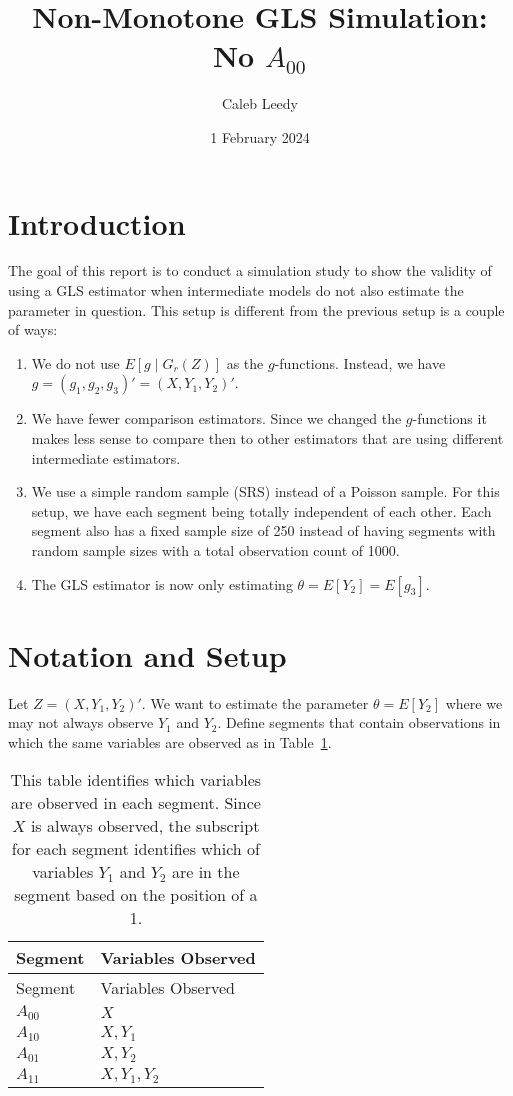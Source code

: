 \documentclass[
  letterpaper,
  DIV=11,
  numbers=noendperiod]{scrartcl}
\title{Non-Monotone GLS Simulation: No \(A_{00}\)}
\author{Caleb Leedy}
\date{1 February 2024}
\providecommand{\tightlist}{%
  \setlength{\itemsep}{0pt}\setlength{\parskip}{0pt}}\usepackage{longtable,booktabs,array}
\begin{document}
\maketitle

\section{Introduction}\label{introduction}

The goal of this report is to conduct a simulation study to show the
validity of using a GLS estimator when intermediate models do not also
estimate the parameter in question. This setup is different from the
previous setup is a couple of ways:

\begin{enumerate}
\def\labelenumi{\arabic{enumi}.}
\tightlist
\item
  We do not use \(E[g \mid G_r(Z)]\) as the \(g\)-functions. Instead, we
  have \(g = (g_1,
  g_2, g_3)' = (X, Y_1, Y_2)'\).
\item
  We have fewer comparison estimators. Since we changed the
  \(g\)-functions it makes less sense to compare then to other
  estimators that are using different intermediate estimators.
\item
  We use a simple random sample (SRS) instead of a Poisson sample. For
  this setup, we have each segment being totally independent of each
  other. Each segment also has a fixed sample size of 250 instead of
  having segments with random sample sizes with a total observation
  count of 1000.
\item
  The GLS estimator is now only estimating \(\theta = E[Y_2] = E[g_3]\).
\end{enumerate}

\section{Notation and Setup}\label{notation-and-setup}

Let \(Z = (X, Y_1, Y_2)'\). We want to estimate the parameter
\(\theta = E[Y_2]\) where we may not always observe \(Y_1\) and \(Y_2\).
Define segments that contain observations in which the same variables
are observed as in Table~\ref{tbl-vars1}.

\begin{longtable}[]{@{}ll@{}}
\caption{This table identifies which variables are observed in each
segment. Since \(X\) is always observed, the subscript for each segment
identifies which of variables \(Y_1\) and \(Y_2\) are in the segment
based on the position of a 1.}\label{tbl-vars1}\tabularnewline
\toprule\noalign{}
Segment & Variables Observed \\
\midrule\noalign{}
\endfirsthead
\toprule\noalign{}
Segment & Variables Observed \\
\midrule\noalign{}
\endhead
\bottomrule\noalign{}
\endlastfoot
\(A_{00}\) & \(X\) \\
\(A_{10}\) & \(X, Y_1\) \\
\(A_{01}\) & \(X, Y_2\) \\
\(A_{11}\) & \(X, Y_1, Y_2\) \\
\end{longtable}
\end{document}
